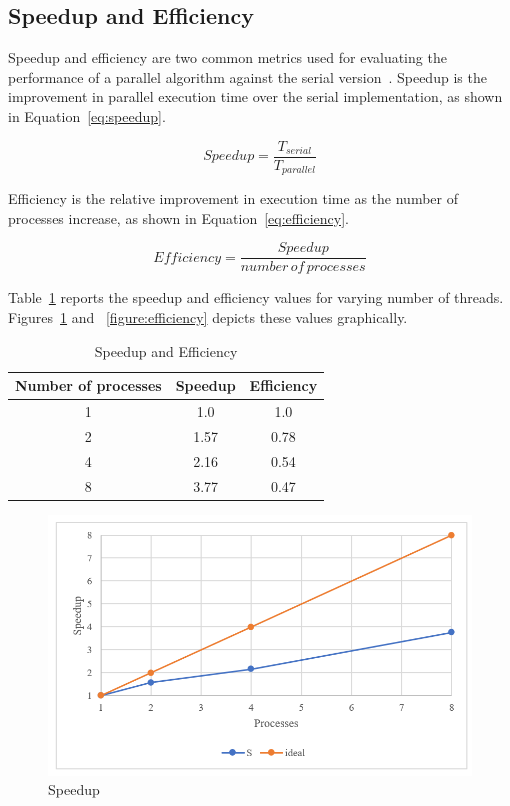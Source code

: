 \documentclass{amsart}
\begin{document}
\subsection{Speedup and Efficiency}
Speedup and efficiency are two common metrics used for evaluating the performance of a parallel algorithm against the serial version~\cite{pacheco}. Speedup is the improvement in parallel execution time over the serial implementation, as shown in Equation~\ref{eq:speedup}.

\begin{equation}
Speedup = \frac{T_{serial}}{T_{parallel}}
\label{eq:speedup}
\end{equation}

Efficiency is the relative improvement in execution time as the number of processes increase, as shown in Equation~\ref{eq:efficiency}. 

\begin{equation}
Efficiency = \frac{Speedup}{number\,of\,processes}
\label{eq:efficiency}
\end{equation}

Table~\ref{table:speedup-efficency} reports the speedup and efficiency values for varying number of threads. Figures~\ref{figure:speedup} and ~\ref{figure:efficiency} depicts these values graphically. 

\begin{table}[htbp]
\caption{Speedup and Efficiency}
\begin{center}
\begin{tabular}{|c|c|c|}
\hline
Number of processes & Speedup & Efficiency \\
\hline
1 & 1.0 & 1.0   \\
2 & 1.57 & 0.78 \\
4 & 2.16 &  0.54 \\
8 & 3.77 & 0.47 \\
\hline
\end{tabular}
\end{center}
\label{table:speedup-efficency}
\end{table}

\begin{figure}[H]
\caption{Speedup}
\begin{center}
\includegraphics{speedup.PNG}
\end{center}
\label{figure:speedup}
\end{figure}
\end{document}

